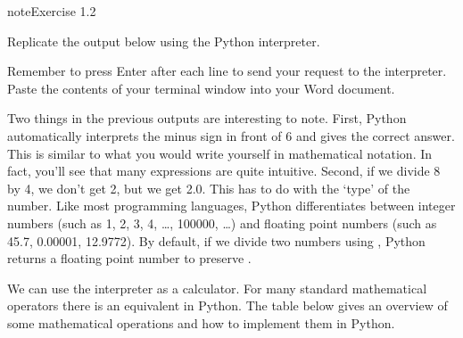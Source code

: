 \documentclass[letterpaper,10pt,english]{jupyterBook}
\begin{document}
\begin{sphinxadmonition}{note}{Exercise 1.2}

\sphinxAtStartPar
Replicate the output below using the Python interpreter.

\begin{sphinxVerbatim}[commandchars=\\\{\}]
\end{sphinxVerbatim}

\sphinxAtStartPar
Remember to press Enter after each line to send your request to the interpreter. Paste the contents of your terminal window into your Word document.
\end{sphinxadmonition}

\sphinxAtStartPar
Two things in the previous outputs are interesting to note. First, Python automatically interprets the minus sign in front of 6 and gives the correct answer. This is similar to what you would write yourself in mathematical notation. In fact, you’ll see that many expressions are quite intuitive. Second, if we divide 8 by 4, we don’t get 2, but we get 2.0. This has to do with the ‘type’ of the number. Like most programming languages, Python differentiates between integer numbers (such as 1, 2, 3, 4, …, 100000, …) and floating point numbers (such as \sphinxhyphen{}45.7, 0.00001, 12.9772). By default, if we divide two numbers using \sphinxcode{\sphinxupquote{/}}, Python returns a floating point number to preserve .

\sphinxAtStartPar
We can use the interpreter as a calculator. For many standard mathematical operators there is an equivalent in Python. The table below gives an overview of some mathematical operations and how to implement them in Python.
\end{document}
